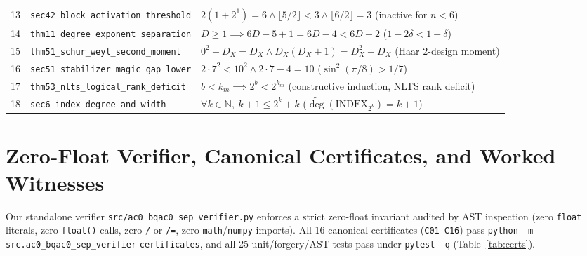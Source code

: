 \documentclass[10pt,twocolumn]{article}
\begin{document}
\begin{table}[t]
\begin{tabular}{@{}cll@{}}
13 & \texttt{sec42\_block\_activation\_threshold} & $2(1+2^1)=6 \wedge \lfloor 5/2\rfloor < 3 \wedge \lfloor 6/2\rfloor = 3$ (inactive for $n<6$) \\
14 & \texttt{thm11\_degree\_exponent\_separation} & $D\ge 1 \implies 6D - 5 + 1 = 6D - 4 < 6D - 2$ ($1-2\delta < 1-\delta$) \\
15 & \texttt{thm51\_schur\_weyl\_second\_moment} & $0^2 + D_X = D_X \wedge D_X(D_X+1) = D_X^2 + D_X$ (Haar $2$-design moment) \\
16 & \texttt{sec51\_stabilizer\_magic\_gap\_lower} & $2\cdot 7^2 < 10^2 \wedge 2\cdot 7 - 4 = 10$ ($\sin^2(\pi/8) > 1/7$) \\
17 & \texttt{thm53\_nlts\_logical\_rank\_deficit} & $b < k_m \implies 2^b < 2^{k_m}$ (constructive induction, NLTS rank deficit) \\
18 & \texttt{sec6\_index\_degree\_and\_width} & $\forall k\in\mathbb{N},\ k + 1 \le 2^k + k$ ($\widetilde{\deg}(\mathrm{INDEX}_{2^k}) = k+1$) \\
\bottomrule
\end{tabular}
\end{table}

\section{Zero-Float Verifier, Canonical Certificates, and Worked Witnesses}
Our standalone verifier \texttt{src/\allowbreak ac0\_bqac0\_sep\_verifier.py} enforces a strict zero-float invariant audited by AST inspection (zero \texttt{float} literals, zero \texttt{float()} calls, zero \texttt{/} or \texttt{/=}, zero \texttt{math}/\texttt{numpy} imports). All 16 canonical certificates (\texttt{C01}--\texttt{C16}) pass \texttt{python -m} \nolinkurl{src.ac0_bqac0_sep_verifier} \texttt{certificates}, and all 25 unit/forgery/AST tests pass under \texttt{pytest -q} (Table~\ref{tab:certs}).
\end{document}
